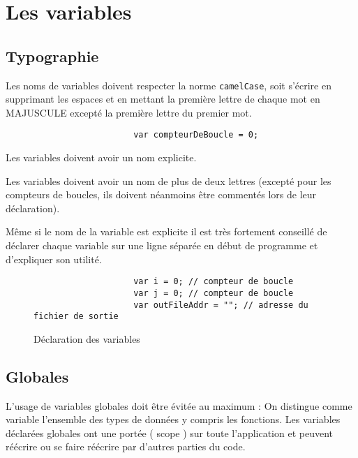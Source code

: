 	\section{Les variables}
		\subsection{Typographie}
			Les noms de variables doivent respecter la norme \verb+camelCase+, soit s'écrire en supprimant les espaces et en mettant la première lettre de chaque mot en MAJUSCULE excepté la première lettre du premier mot.

			\begin{figure}[H]
				\begin{changemargin}{-2.5cm}{-2.5cm}
				\begin{tcolorbox}
				\begin{verbatim}
					var compteurDeBoucle = 0;
				\end{verbatim}
				\end{tcolorbox}
				\end{changemargin}
			\end{figure}

			Les variables doivent avoir un nom explicite.

			Les variables doivent avoir un nom de plus de deux lettres (excepté pour les compteurs de boucles, ils doivent néanmoins être commentés lors de leur déclaration).

			Même si le nom de la variable est explicite il est très fortement conseillé de déclarer chaque variable sur une ligne séparée en début de programme et d'expliquer son utilité.

			\begin{figure}[H]
				\begin{changemargin}{-2.5cm}{-2.5cm}
				\begin{tcolorbox}
				\begin{verbatim}
					var i = 0; // compteur de boucle
					var j = 0; // compteur de boucle
					var outFileAddr = ""; // adresse du fichier de sortie
				\end{verbatim}
				\end{tcolorbox}
				\end{changemargin}
				\caption{Déclaration des variables}
			\end{figure}
			
		\subsection{Globales}
			L'usage de variables globales doit être évitée au maximum : On distingue comme variable l'ensemble des types de données y compris les fonctions. Les variables déclarées globales ont une portée ( scope ) sur toute l'application et peuvent réécrire ou se faire réécrire par d'autres parties du code.

